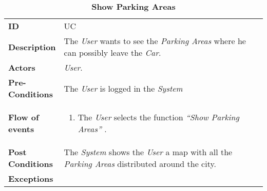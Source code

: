 \begin{longtable}{|p{0.2\linewidth} p{0.8\linewidth}|}
	\captionsetup{labelformat=empty} %
	\caption{\textbf{Show Parking Areas}} %
	\label{UC_Logout}%
	\\ \hline %
	
	\textbf{ID} & UC\theUseCaseIdCounter \\ \hline
	\textbf{Description} & The \emph{User} wants to see the \emph{Parking Areas} where he can possibly leave the \emph{Car}. \\ \hline
	\textbf{Actors} & \emph{User}.\\ \hline
	\textbf{Pre-Conditions} & The \emph{User} is logged in the \emph{System} \\ \hline
	\textbf{Flow of events} & 
	\begin{enumerate}
		\item The \emph{User} selects the function \textit{\textquotedblleft{Show Parking Areas}\textquotedblright} .
	\end{enumerate}	 \\ \hline
	\textbf{Post Conditions} & The \emph{System} shows the \emph{User} a map with all the \emph{Parking Areas} distributed around the city. \\ \hline
	\textbf{Exceptions} &  \\
	\hline
\end{longtable}

